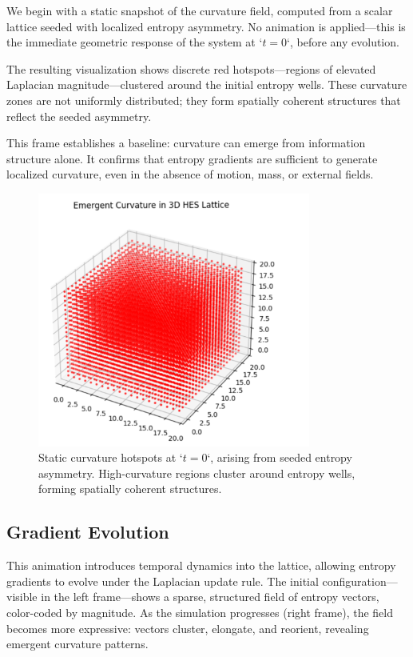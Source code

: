 \documentclass[12pt]{article}
\begin{document}
We begin with a static snapshot of the curvature field, computed from a scalar lattice seeded with localized entropy asymmetry. No animation is applied—this is the immediate geometric response of the system at `\( t = 0 \)`, before any evolution.

The resulting visualization shows discrete red hotspots—regions of elevated Laplacian magnitude—clustered around the initial entropy wells. These curvature zones are not uniformly distributed; they form spatially coherent structures that reflect the seeded asymmetry.

This frame establishes a baseline: curvature can emerge from information structure alone. It confirms that entropy gradients are sufficient to generate localized curvature, even in the absence of motion, mass, or external fields.

\begin{figure}[h]
    \centering
    \includegraphics[width=0.8\textwidth]{Figures/Figure_6.PNG}
    \caption{Static curvature hotspots at `\( t = 0 \)`, arising from seeded entropy asymmetry. High-curvature regions cluster around entropy wells, forming spatially coherent structures.}
    \label{fig:static_curvature}
\end{figure}


\subsection{Gradient Evolution}

This animation introduces temporal dynamics into the lattice, allowing entropy gradients to evolve under the Laplacian update rule. The initial configuration—visible in the left frame—shows a sparse, structured field of entropy vectors, color-coded by magnitude. As the simulation progresses (right frame), the field becomes more expressive: vectors cluster, elongate, and reorient, revealing emergent curvature patterns.
\end{document}
